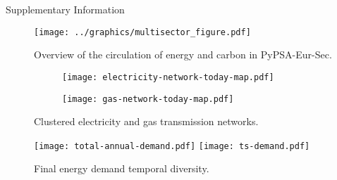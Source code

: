 
\Large{Supplementary Information}
\label{sec:si}
\normalsize

\begin{figure}[ht!]
    \centering
    \texttt{[image: ../graphics/multisector\_figure.pdf]}
    \caption{Overview of the circulation of energy and carbon in PyPSA-Eur-Sec.}
    \label{fig:multisector}
\end{figure}

\begin{figure}[ht!]
    \centering
\begin{subfigure}[t]{0.4\textwidth}
    \centering
    \texttt{[image: electricity-network-today-map.pdf]}
\end{subfigure}
\begin{subfigure}[t]{0.4\textwidth}
    \centering
    \texttt{[image: gas-network-today-map.pdf]}
\end{subfigure}
\caption{Clustered electricity and gas transmission networks.}
\label{fig:clustered-networks}
\end{figure}

\begin{figure}[ht!]
    \centering
    \texttt{[image: total-annual-demand.pdf]}
    \texttt{[image: ts-demand.pdf]}
    \caption{Final energy demand temporal diversity.}
    \label{fig:demand-time}
\end{figure}
\restoregeometry

